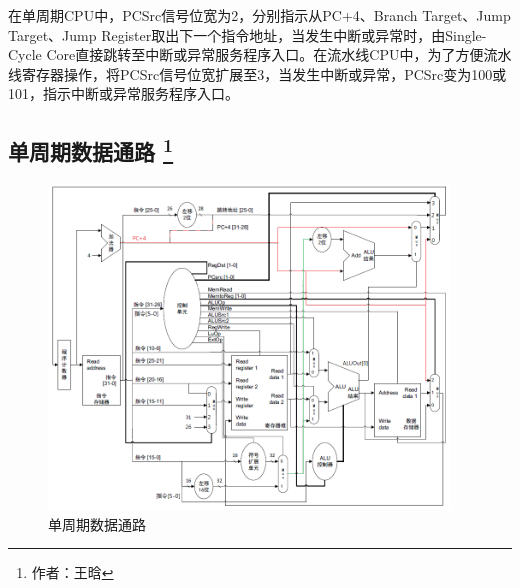 \documentclass{article}
\begin{document}
            在单周期CPU中，PCSrc信号位宽为2，分别指示从PC+4、Branch Target、Jump Target、Jump Register取出下一个指令地址，当发生中断或异常时，由Single-Cycle Core直接跳转至中断或异常服务程序入口。在流水线CPU中，为了方便流水线寄存器操作，将PCSrc信号位宽扩展至3，当发生中断或异常，PCSrc变为100或101，指示中断或异常服务程序入口。

        \subsection{单周期数据通路 \protect\footnote{作者：王晗}}
            \begin{figure}[H]
                \centering
                \includegraphics[width=0.95\textwidth]{images/singlecycle_datapath.png}
                \caption{\label{fig:singlecycle_datapath}单周期数据通路}
            \end{figure}
\end{document}
